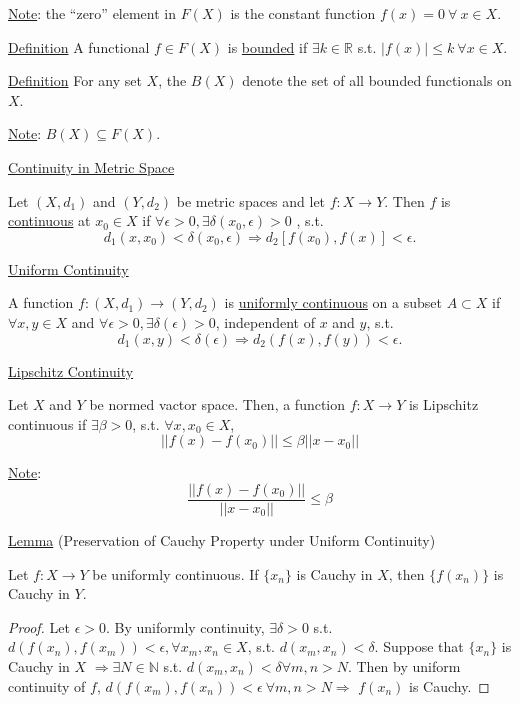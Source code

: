 \documentclass[twoside]{article}
\newcommand\imp{$\Longrightarrow$}
\begin{document}
\underline{Note}: the ``zero'' element in $F(X)$ is the constant function $f(x) = 0 ~ \forall ~ x \in X$.

\underline{Definition} A functional $f \in F(X)$ is \underline{bounded} if $\exists k \in \mathbb{R}$ s.t. $|f(x)| \leq k ~ \forall x \in X$.

\underline{Definition} For any set $X$, the $B(X)$ denote the set of all bounded functionals on $X$.

\underline{Note}: $B(X) \subseteq F(X)$.

\underline{Continuity in Metric Space}

Let $(X,d_{1})$ and $(Y,d_{2})$ be metric spaces and let $f: X \to Y$. Then $f$ is \underline{continuous} at $x_{0} \in X$ if $\forall \epsilon >  0, \exists \delta(x_{0},\epsilon) > 0$ , s.t. 
$$d_{1}(x, x_{0})< \delta(x_{0},\epsilon) \Longrightarrow d_{2}[f(x_{0}),f(x)] < \epsilon.$$

\underline{Uniform Continuity}

A function $f : (X,d_1) \to (Y,d_2)$ is \underline{uniformly continuous} on a subset $A \subset X$ if $\forall x, y \in X$ and $\forall \epsilon > 0, \exists \delta(\epsilon) >0$, independent of $x$ and $y$, s.t. $$d_{1}(x,y) < \delta(\epsilon) \Longrightarrow d_{2}(f(x),f(y)) < \epsilon.$$

\underline{Lipschitz Continuity}

Let $X$ and $Y$ be normed vactor space. Then, a function $f: X \to  Y $ is Lipschitz continuous if $\exists \beta > 0$, s.t. $\forall x, x_{0} \in X$, 
\[
    || f(x) - f(x_0) || \leq \beta || x - x_{0}||
\]

\underline{Note}:
\begin{equation}
    \frac{||f(x)-f(x_0)||}{||x-x_0||} \leq \beta
\end{equation}

\underline{Lemma} (Preservation of Cauchy Property under Uniform Continuity)

Let $f : X \to Y$ be uniformly continuous. If $\{ x_{n}\}$ is Cauchy in $X$, then $\{ f(x_{n}) \}$ is Cauchy in $Y$.

\begin{proof}
    Let $\epsilon > 0$. By uniformly continuity, $\exists \delta > 0$ s.t. $d(f(x_{n}), f(x_{m})) < \epsilon, \forall x_{m}, x_{n} \in X$, s.t. $d(x_m,x_n) < \delta$. Suppose that $\{x_{n}\}$ is Cauchy in $X$ \imp $\exists N \in \mathbb{N}$ s.t. $ d(x_m,x_n) < \delta \forall m, n > N$. Then by uniform continuity of $f$,
    $d(f(x_m), f(x_n)) < \epsilon ~ \forall m, n > N \Longrightarrow$ $f(x_n)$ is Cauchy.
\end{proof}
\end{document}
